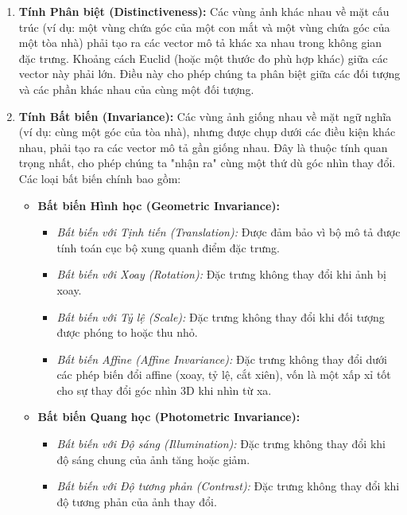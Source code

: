 \begin{enumerate}
    \item \textbf{Tính Phân biệt (Distinctiveness):} Các vùng ảnh khác nhau về mặt cấu trúc (ví dụ: một vùng chứa góc của một con mắt và một vùng chứa góc của một tòa nhà) phải tạo ra các vector mô tả khác xa nhau trong không gian đặc trưng. Khoảng cách Euclid (hoặc một thước đo phù hợp khác) giữa các vector này phải lớn. Điều này cho phép chúng ta phân biệt giữa các đối tượng và các phần khác nhau của cùng một đối tượng.

    \item \textbf{Tính Bất biến (Invariance):} Các vùng ảnh giống nhau về mặt ngữ nghĩa (ví dụ: cùng một góc của tòa nhà), nhưng được chụp dưới các điều kiện khác nhau, phải tạo ra các vector mô tả gần giống nhau. Đây là thuộc tính quan trọng nhất, cho phép chúng ta "nhận ra" cùng một thứ dù góc nhìn thay đổi. Các loại bất biến chính bao gồm:
    \begin{itemize}
        \item \textbf{Bất biến Hình học (Geometric Invariance):}
            \begin{itemize}
                \item \textit{Bất biến với Tịnh tiến (Translation):} Được đảm bảo vì bộ mô tả được tính toán cục bộ xung quanh điểm đặc trưng.
                \item \textit{Bất biến với Xoay (Rotation):} Đặc trưng không thay đổi khi ảnh bị xoay.
                \item \textit{Bất biến với Tỷ lệ (Scale):} Đặc trưng không thay đổi khi đối tượng được phóng to hoặc thu nhỏ.
                \item \textit{Bất biến Affine (Affine Invariance):} Đặc trưng không thay đổi dưới các phép biến đổi affine (xoay, tỷ lệ, cắt xiên), vốn là một xấp xỉ tốt cho sự thay đổi góc nhìn 3D khi nhìn từ xa.
            \end{itemize}
        \item \textbf{Bất biến Quang học (Photometric Invariance):}
            \begin{itemize}
                \item \textit{Bất biến với Độ sáng (Illumination):} Đặc trưng không thay đổi khi độ sáng chung của ảnh tăng hoặc giảm.
                \item \textit{Bất biến với Độ tương phản (Contrast):} Đặc trưng không thay đổi khi độ tương phản của ảnh thay đổi.
            \end{itemize}
    \end{itemize}
\end{enumerate}

